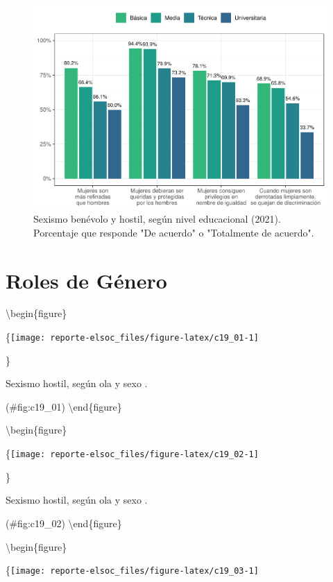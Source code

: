 \documentclass[
  12pt,
  openany]{book}
\begin{document}
\begin{figure}

{\centering \includegraphics{reporte-elsoc_files/figure-latex/sexismo-educ-1} 

}

\caption{Sexismo benévolo y hostil, según nivel educacional (2021). Porcentaje que responde "De acuerdo" o "Totalmente de acuerdo".}\label{fig:sexismo-educ}
\end{figure}

\hypertarget{roles-de-guxe9nero}{%
\section{Roles de Género}\label{roles-de-guxe9nero}}

\textbackslash begin\{figure\}

\{\centering \texttt{[image: reporte-elsoc\_files/figure-latex/c19\_01-1]}

\}

\caption{Sexismo hostil, según ola y sexo .}

(\#fig:c19\_01)
\textbackslash end\{figure\}

\textbackslash begin\{figure\}

\{\centering \texttt{[image: reporte-elsoc\_files/figure-latex/c19\_02-1]}

\}

\caption{Sexismo hostil, según ola y sexo .}

(\#fig:c19\_02)
\textbackslash end\{figure\}

\textbackslash begin\{figure\}

\{\centering \texttt{[image: reporte-elsoc\_files/figure-latex/c19\_03-1]}
\end{document}
